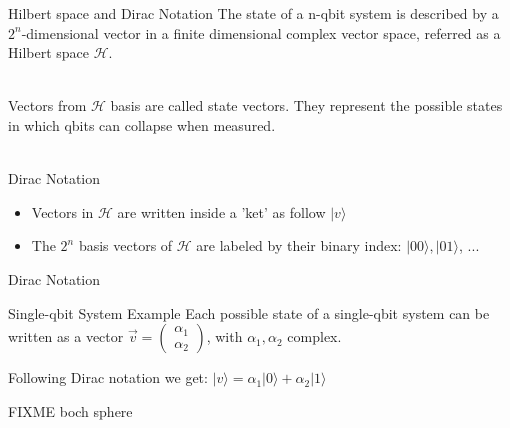 \documentclass[svgnames,smaller,aspectratio=169]{beamer}
\begin{document}
\begin{frame}[fragile]{Hilbert space and Dirac Notation}
  The state of a n-qbit system is described by a $2^n$-dimensional vector in a finite dimensional complex vector space,
  referred as a Hilbert space $\mathcal{H}$. \\~\

  Vectors from $\mathcal{H}$ basis are called state vectors. They represent the possible states in which qbits can
  collapse when measured. \\~\
  
  \begin{block}{Dirac Notation}
  \begin{itemize}
  \item Vectors in $\mathcal{H}$ are written inside a 'ket' as follow $|v\rangle$
  \item The $2^n$ basis vectors of $\mathcal{H}$ are labeled by their binary index: $ |00\rangle, |01\rangle$, ...
  \end{itemize}
  \end{block}

\end{frame}

\begin{frame}[fragile]{Dirac Notation}

  \begin{block}{Single-qbit System Example}
    Each possible state of a single-qbit system can be written as a vector $\vec{v} = \begin{pmatrix} \alpha_1 \\ \alpha_2 \end{pmatrix}$, with $\alpha_1, \alpha_2$ complex.
    
    Following Dirac notation we get: $ |v\rangle = \alpha_1 |0\rangle + \alpha_2 |1\rangle $
  \end{block}
  
  FIXME boch sphere
\end{frame}
\end{document}
